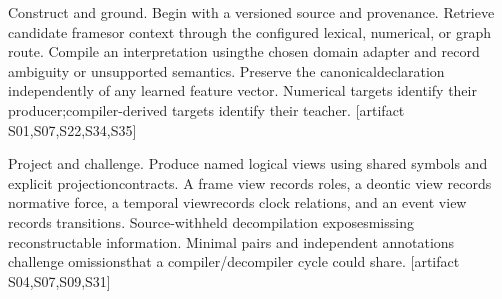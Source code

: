 \noindent
Construct and ground. Begin with a versioned source and provenance. Retrieve candidate frames\linebreak[4]
or context through the configured lexical, numerical, or graph route. Compile an interpretation using\linebreak[4]
the chosen domain adapter and record ambiguity or unsupported semantics. Preserve the canonical\linebreak[4]
declaration independently of any learned feature vector. Numerical targets identify their producer;\linebreak[4]
compiler-derived targets identify their teacher. [artifact S01,S07,S22,S34,S35]\par

\noindent
Project and challenge. Produce named logical views using shared symbols and explicit projection\linebreak[4]
contracts. A frame view records roles, a deontic view records normative force, a temporal view\linebreak[4]
records clock relations, and an event view records transitions. Source-withheld decompilation exposes\linebreak[4]
missing reconstructable information. Minimal pairs and independent annotations challenge omissions\linebreak[4]
that a compiler/decompiler cycle could share. [artifact S04,S07,S09,S31]\par

